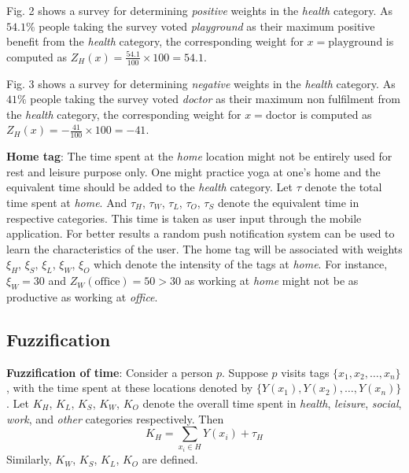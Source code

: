 \documentclass[conference]{IEEEtran}
\begin{document}
Fig. 2 shows a survey for determining \textit{positive} weights in the \textit{health} category. As $54.1\%$ people taking the survey voted \textit{playground} as their maximum positive benefit from the \textit{health} category, the corresponding weight for $x = \text{playground}$ is computed as $Z_H(x) = \frac{54.1}{100} \times 100 = 54.1$.

Fig. 3 shows a survey for determining \textit{negative} weights in the \textit{health} category. As $41\%$ people taking the survey voted \textit{doctor} as their maximum non fulfilment from the \textit{health} category, the corresponding weight for $x = \text{doctor}$ is computed as $Z_H(x) = -\frac{41}{100} \times 100 = -41$.

\textbf{Home tag}: The time spent at the \textit{home} location might not be entirely used for rest and leisure purpose only. One might practice yoga at one\rq s home and the equivalent time should be added to the \textit{health} category. Let $\tau$ denote the total time spent at \textit{home}. And $\tau_H$, $\tau_W$, $\tau_L$, $\tau_O$, $\tau_S$ denote the equivalent time in respective categories. This time is taken as user input through the mobile application. For better results a random push notification system can be used to learn the characteristics of the user. The home tag will be associated with weights $\xi_H$, $\xi_S$, $\xi_L$, $\xi_W$, $\xi_O$ which denote the intensity of the tags at \textit{home}. For instance, $\xi_W=30$ and $Z_W(\text{office}) = 50 > 30$ as working at \textit{home} might not be as productive as working at \textit{office}.

\subsection{Fuzzification}

\textbf{Fuzzification of time}: Consider a person $p$. Suppose $p$ visits tags $\{x_1, x_2, \ldots, x_n\}$, with the time spent at these locations denoted by $\{Y(x_1), Y(x_2), \ldots, Y(x_n)\}$. Let $K_H$, $K_L$, $K_S$, $K_W$, $K_O$ denote the overall time spent in \textit{health}, \textit{leisure}, \textit{social}, \textit{work}, and \textit{other} categories respectively. Then 
\[
K_H = \sum_{x_i \in H}Y(x_i) + \tau_H
\]
Similarly, $K_W$, $K_S$, $K_L$, $K_O$ are defined.
\end{document}
